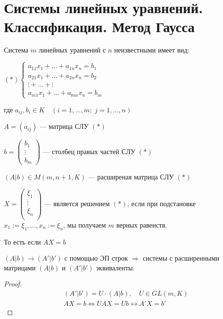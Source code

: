 \section{Системы линейных уравнений. Классификация. Метод Гаусса}

\begin{conj}
    
    Система $m$ линейных уравнений с $n$ неизвестными имеет вид:

    $(*)\begin{cases}
        a_{11}x_1 + \dots + a_{1n}x_n = b_1 \\
        a_{21}x_1 + \dots + a_{2n}x_n = b_2 \\
        \vdots + \dots + \vdots \\
        a_{m1}x_1 + \dots + a_{mn}x_n = b_m
    \end{cases}$

    где $a_{ij}, b_i \in K \quad (i = 1, \dots, m; \; j = 1, \dots, n)$

    $A = (a_{ij})$ --- матрица СЛУ $(*)$

    $b =
    \begin{pmatrix}
        b_1 \\
        \vdots \\
        b_m    
    \end{pmatrix}$ --- столбец правых частей СЛУ $(*)$

    $(A | b) \in M(m, n + 1, K)$ --- расширеная матрица СЛУ $(*)$

\end{conj}

\begin{conj}
    $X = 
    \begin{pmatrix}
        \xi_1 \\
        \vdots \\
        \xi_n \\
    \end{pmatrix}$ --- является решением $(*)$,
    если при подстановке $x_1:=\xi_1, \dots, x_n:=\xi_n$, 
    мы получаем $m$ верных равенств.

    То есть если $AX = b$
\end{conj}

\begin{theorem-non}
    $(A|b) \rightarrow (A'|b')$ с помощью ЭП строк
    $\Longrightarrow$ системы с расширенными
    матрицами $(A|b)$ и $(A'|b')$ эквиваленты.

    \begin{proof}
        \begin{gather*}
            (A'|b') = U \cdot (A | b), \quad U \in GL(m, K) \\
            AX = b \Longleftrightarrow UAX = Ub \longleftrightarrow A'X = b'      
        \end{gather*}
    \end{proof}

\end{theorem-non}

